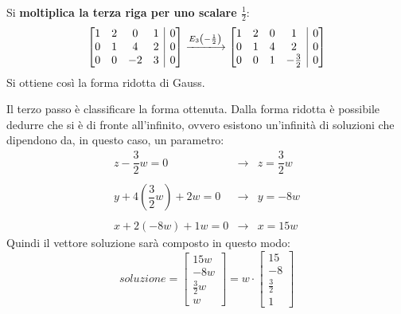 \documentclass[a4paper]{article}
\makeatletter
\newenvironment{rowequmatbra}[1]{\left[\array{@{}#1@{}}}{\endarray\right]}
\makeatother
\begin{document}
	Si \textbf{moltiplica la terza riga per uno scalare $\frac{1}{2}$}:
	\begin{equation*}
		\begin{rowequmatbra}{cccc|c}
			1  &  2 &  0 &  1 & 0 	\\
			0  &  1 &  4 &  2 & 0	\\
			0  &  0 & -2 &  3 & 0
		\end{rowequmatbra} \xlongrightarrow{E_{3}\left(-\frac{1}{2}\right)}
		\begin{rowequmatbra}{cccc|c}
			1  &  2 &  0 &  1 & 0 	\\
			0  &  1 &  4 &  2 & 0	\\
			0  &  0 &  1 &  -\frac{3}{2} & 0
		\end{rowequmatbra}
	\end{equation*}
	Si ottiene così la forma ridotta di Gauss.\newpage
	
	\noindent
	Il \textcolor{Red3}{terzo passo} è classificare la forma ottenuta. Dalla forma ridotta è possibile dedurre che si è di fronte all'infinito, ovvero esistono un'infinità di soluzioni che dipendono da, in questo caso, un parametro:
	\begin{equation*}
		\begin{array}{rll}
			z - \dfrac{3}{2} w = 0 & \longrightarrow & z = \dfrac{3}{2} w \\
			\\
			y + 4\left(\dfrac{3}{2}w\right) + 2w = 0 & \longrightarrow & y = -8w \\
			\\
			x + 2\left(-8w\right) + 1w = 0 & \longrightarrow & x = 15w
		\end{array}
	\end{equation*}
	Quindi il vettore soluzione sarà composto in questo modo:
	\begin{equation*}
		soluzione = \begin{bmatrix}
			15w \\[0.3em]
			-8w \\[0.3em]
			\frac{3}{2}w \\[0.3em]
			w
		\end{bmatrix} = w \cdot \begin{bmatrix}
			15 \\[0.3em]
			-8 \\[0.3em]
			\frac{3}{2} \\[0.3em]
			1
		\end{bmatrix}
	\end{equation*}\newpage
\end{document}
